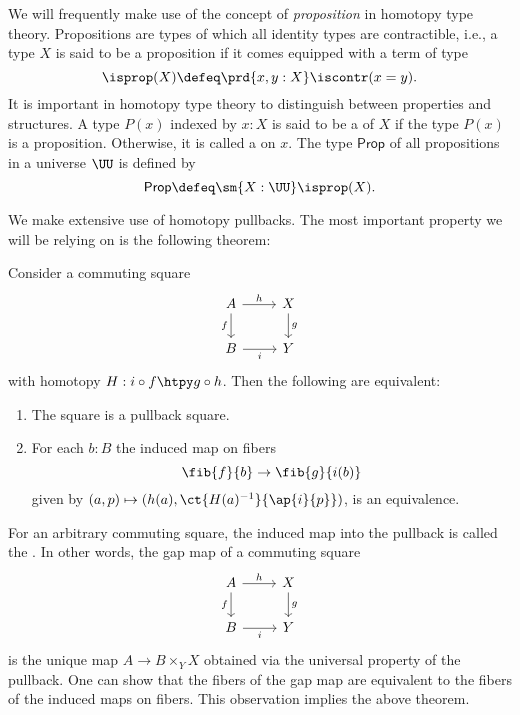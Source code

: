 \documentclass{msc}
\begin{document}
We will frequently make use of the concept of \emph{proposition} in homotopy type theory. Propositions are types of which all identity types are contractible, i.e., a type $X$ is said to be a proposition if it comes equipped with a term of type
\begin{equation*}
  \isprop(X)\defeq\prd{x,y:X}\iscontr(x=y).
\end{equation*}
It is important in homotopy type theory to distinguish between properties and structures. A type $P(x)$ indexed by $x:X$ is said to be a  of $X$ if the type $P(x)$ is a proposition. Otherwise, it is called a  on $x$. The type $\mathsf{Prop}$ of all propositions in a universe $\UU$ is defined by
\begin{equation*}
  \mathsf{Prop}\defeq \sm{X:\UU}\isprop(X).
\end{equation*}

We make extensive use of homotopy pullbacks. The most important property we will be relying on is the following theorem:

\begin{thm}\label{thm:pullback}
  Consider a commuting square
  \begin{equation*}
    \begin{tikzcd}
      A \arrow[r,"h"] \arrow[d,swap,"f"] & X \arrow[d,"g"] \\
      B \arrow[r,swap,"i"] & Y
    \end{tikzcd}
  \end{equation*}
  with homotopy $H:i\circ f\htpy g\circ h$. Then the following are equivalent:
  \begin{enumerate}
  \item The square is a pullback square.
  \item For each $b:B$ the induced map on fibers
    \begin{equation*}
      \fib{f}{b} \to \fib{g}{i(b)}
    \end{equation*}
    given by $(a,p)\mapsto (h(a),\ct{H(a)^{-1}}{\ap{i}{p}})$, is an equivalence.
  \end{enumerate}
\end{thm}

For an arbitrary commuting square, the induced map into the pullback is called the . In other words, the gap map of a commuting square
  \begin{equation*}
    \begin{tikzcd}
      A \arrow[r,"h"] \arrow[d,swap,"f"] & X \arrow[d,"g"] \\
      B \arrow[r,swap,"i"] & Y
    \end{tikzcd}
  \end{equation*}
is the unique map $A\to B\times_Y X$ obtained via the universal property of the pullback. One can show that the fibers of the gap map are equivalent to the fibers of the induced maps on fibers. This observation implies the above theorem.
\end{document}
